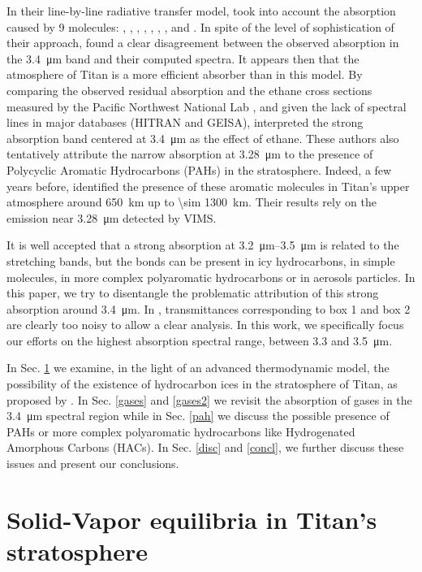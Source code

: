 \documentclass{arxiv-icarus}
\begin{document}
In their line-by-line radiative transfer model, \cite{Maltagliati2015} took into account the absorption caused by 9 molecules: , , , , , , ,  and .
In spite of the level of sophistication of their
approach, \cite{Maltagliati2015} found a clear disagreement between the observed absorption in the \SI{3.4}{\um} band and their computed spectra. It appears then that the atmosphere of Titan is a more
efficient absorber than in this model. By comparing the observed residual absorption
and the ethane cross sections measured by the Pacific Northwest National Lab \citep[PNNL - ][]{Sharpe2016}, and given the lack of 
spectral lines in major databases (HITRAN and GEISA), \cite{Maltagliati2015} interpreted the strong absorption band centered at \SI{3.4}{\um} as
the effect of ethane. These authors also tentatively attribute the narrow absorption at \SI{3.28}{\um} to the presence of Polycyclic Aromatic Hydrocarbons
(PAHs) in the stratosphere. Indeed, a few years before, \cite{Lopez-Puertas2013} identified the presence of these aromatic
molecules in Titan's upper atmosphere around \SI{650}{km} up to \SI{\sim 1300}{km}. Their results rely on the emission near
\SI{3.28}{\um} detected by VIMS.

It is well accepted that a strong absorption at \SIrange{3.2}{3.5}{\um} is related to the  stretching bands, but the  bonds can be present in icy hydrocarbons, in simple molecules, in more complex polyaromatic hydrocarbons or in aerosols particles. In this paper, we try to disentangle the problematic attribution of this strong
absorption around \SI{3.4}{\um}. In , transmittances corresponding to box 1 and box 2 are
clearly too noisy to allow a clear analysis. In this work, we specifically focus our efforts on the highest absorption spectral range, \ie between \num{3.3} and \SI{3.5}{\um}.

In Sec. \ref{thermod} we examine, in the light of an advanced thermodynamic model, the possibility of the existence of hydrocarbon ices in the stratosphere of Titan, as proposed by \cite{Kim2011}.
In Sec. \ref{gases} and \ref{gases2} we revisit the absorption of gases in the \SI{3.4}{\um} spectral region while in Sec. \ref{pah} we discuss the possible presence of PAHs or more complex polyaromatic hydrocarbons like Hydrogenated Amorphous Carbons (HACs).
In Sec. \ref{disc} and \ref{concl}, we further discuss these issues and present our conclusions.


\section{Solid-Vapor equilibria in Titan's stratosphere}
\label{thermod}
\end{document}
